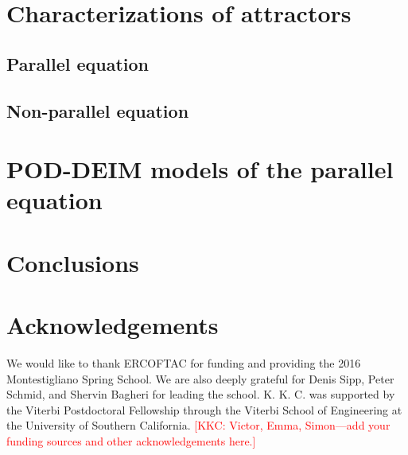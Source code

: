 \documentclass[11pt]{article}
\newcommand{\kkc}[1]{\textcolor{red}{[KKC: #1]}}
\begin{document}
\cite{WeidemanACMTMS00}
\cite{HouJCP07}
\cite{HechtJNM12}

\section{Characterizations of attractors}
\label{sec:attractors}

\subsection{Parallel equation}


\subsection{Non-parallel equation}

\section{POD-DEIM models of the parallel equation}
\label{sec:pod-deim}

\section{Conclusions}
\label{sec:conclusions}

\section{Acknowledgements}

We would like to thank ERCOFTAC for funding and providing the 2016 Montestigliano Spring School.
We are also deeply grateful for Denis Sipp, Peter Schmid, and Shervin Bagheri for leading the school.
K. K. C. was supported by the Viterbi Postdoctoral Fellowship through the Viterbi School of Engineering at the University of Southern California.
\kkc{Victor, Emma, Simon---add your funding sources and other acknowledgements here.}


\end{document}
